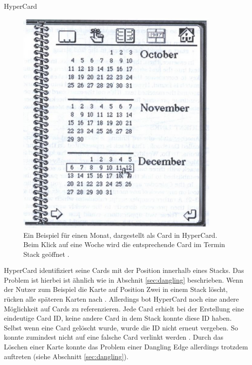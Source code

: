 \begin{section}{HyperCard}
\begin{figure}[H]
	\centering
	\includegraphics[width=0.9\textwidth]{image/hypercardLink}
	\caption{Ein Beispiel für einen Monat, dargestellt als Card in HyperCard. Beim Klick auf eine Woche wird die entsprechende Card im Termin Stack geöffnet \cite{Goodman1988}.}
	\label{fig:hypercardLink}
\end{figure}

HyperCard identifiziert seine Cards mit der Position innerhalb eines Stacks. Das Problem ist hierbei ist ähnlich wie in Abschnit \ref{sec:dangling} beschrieben. Wenn der Nutzer zum Beispiel die Karte auf Position Zwei in einem Stack löscht, rücken alle späteren Karten nach \cite{Goodman1988}. Allerdings bot HyperCard noch eine andere Möglichkeit auf Cards zu referenzieren. Jede Card erhielt bei der Erstellung eine eindeutige Card ID, keine andere Card in dem Stack konnte diese ID haben. Selbst wenn eine Card gelöscht wurde, wurde die ID nicht erneut vergeben. So konnte zumindest nicht auf eine falsche Card verlinkt werden \cite{Goodman1988}. Durch das Löschen einer Karte konnte das Problem einer Dangling Edge allerdings trotzdem auftreten (siehe Abschnitt \ref{sec:dangling}).

\end{section}

